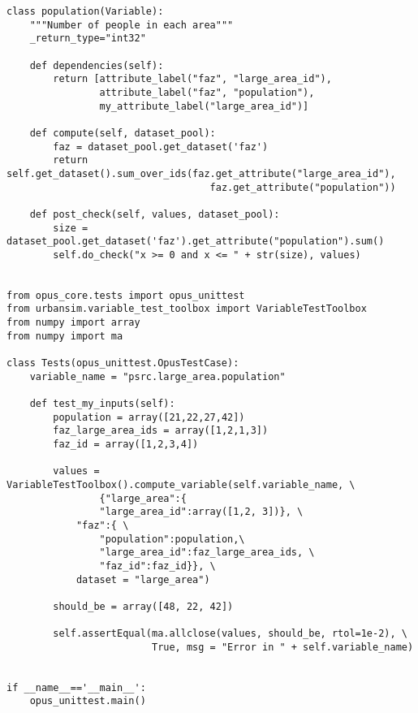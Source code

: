 \variablesindex\attributesindex\numpyindex
\begin{verbatim}
class population(Variable):
    """Number of people in each area"""
    _return_type="int32"

    def dependencies(self):
        return [attribute_label("faz", "large_area_id"), 
                attribute_label("faz", "population"), 
                my_attribute_label("large_area_id")]

    def compute(self, dataset_pool):
        faz = dataset_pool.get_dataset('faz')
        return self.get_dataset().sum_over_ids(faz.get_attribute("large_area_id"), 
                                   faz.get_attribute("population"))

    def post_check(self, values, dataset_pool):
        size = dataset_pool.get_dataset('faz').get_attribute("population").sum()
        self.do_check("x >= 0 and x <= " + str(size), values)
    

from opus_core.tests import opus_unittest
from urbansim.variable_test_toolbox import VariableTestToolbox
from numpy import array
from numpy import ma

class Tests(opus_unittest.OpusTestCase):
    variable_name = "psrc.large_area.population"
 
    def test_my_inputs(self):
        population = array([21,22,27,42]) 
        faz_large_area_ids = array([1,2,1,3]) 
        faz_id = array([1,2,3,4])
            
        values = VariableTestToolbox().compute_variable(self.variable_name, \
                {"large_area":{
                "large_area_id":array([1,2, 3])}, \
            "faz":{ \
                "population":population,\
                "large_area_id":faz_large_area_ids, \
                "faz_id":faz_id}}, \
            dataset = "large_area")

        should_be = array([48, 22, 42])
        
        self.assertEqual(ma.allclose(values, should_be, rtol=1e-2), \
                         True, msg = "Error in " + self.variable_name)


if __name__=='__main__':
    opus_unittest.main()
\end{verbatim}

